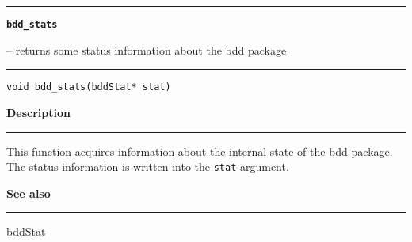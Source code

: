 \begin{minipage}{\textwidth}

\noindent\begin{minipage}{\textwidth}
\rule{\textwidth}{0.5mm}
{\tt\bf bdd\_stats }
\--- returns some status information about the bdd package  \hspace{\fill}
\\\rule[1.5ex]{\textwidth}{0.5mm}
\end{minipage}

\noindent\begin{verbatim}
void bdd_stats(bddStat* stat) 
\end{verbatim}

\vspace{\parsep}\noindent
{\bf Description}\\\rule[1.5ex]{\textwidth}{0.2mm}\vspace{-1.5ex}\setlength{\parindent}{1em}
This function acquires information about the internal state of
           the bdd package. The status information is written into the
	   {\tt stat} argument. 

\vspace{\parsep}\vspace{\baselineskip}\noindent
{\bf See also}\\\rule[1.5ex]{\textwidth}{0.2mm}\vspace{-1.5ex}
bddStat 
\end{minipage}
\vspace{8ex}
